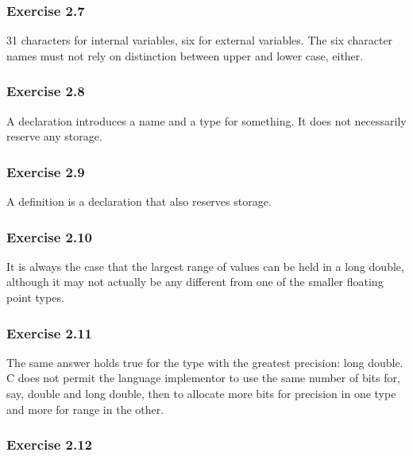   

  \subsubsection*{Exercise 2.7}

   31 characters for internal variables, six for external variables. The six
    character names must not rely on distinction between upper and lower case,
    either.


  

  \subsubsection*{Exercise 2.8}

   A declaration introduces a name and a type for something. It does not
    necessarily reserve any storage.


  

  \subsubsection*{Exercise 2.9}

   A definition is a declaration that also reserves storage.


  

  \subsubsection*{Exercise 2.10}

   It is always the case that the largest range of values can be held in
    a long double, although it may not actually be any different from one of
    the smaller floating point types.


  

  \subsubsection*{Exercise 2.11}

   The same answer holds true for the type with the greatest precision: long
    double. C does not permit the language implementor to use the same number
    of bits for, say, double and long double, then to allocate more bits for
    precision in one type and more for range in the other.


  

  \subsubsection*{Exercise 2.12}

